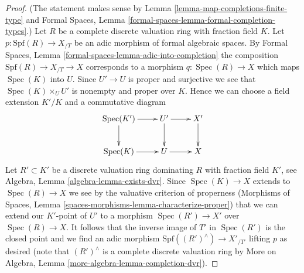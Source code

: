 \documentclass[10pt,a4paper]{amsart}
\theoremstyle{plain}
\theoremstyle{definition}
\theoremstyle{remark}
\numberwithin{equation}{subsection}
\def\Spec{\mathop{\mathrm{Spec}}}
\begin{document}
\begin{proof}
(The statement makes sense by
Lemma \ref{lemma-map-completions-finite-type} and
Formal Spaces, Lemma \ref{formal-spaces-lemma-formal-completion-types}.)
Let $R$ be a complete discrete valuation ring with fraction field $K$.
Let $p : \text{Spf}(R) \to X_{/T}$ be an adic morphism of
formal algebraic spaces. By Formal Spaces, Lemma
\ref{formal-spaces-lemma-adic-into-completion}
the composition $\text{Spf}(R) \to X_{/T} \to X$
corresponds to a morphism $q : \Spec(R) \to X$
which maps $\Spec(K)$ into $U$. Since $U' \to U$ is proper and surjective
we see that $\Spec(K) \times_U U'$ is nonempty and proper over $K$.
Hence we can choose a field extension $K'/K$ and a commutative
diagram
$$
\xymatrix{
\Spec(K') \ar[r] \ar[d] & U' \ar[r] \ar[d] & X' \ar[d] \\
\Spec(K) \ar[r] & U \ar[r] & X
}
$$
Let $R' \subset K'$ be a discrete valuation ring dominating $R$
with fraction field $K'$, see Algebra, Lemma \ref{algebra-lemma-exists-dvr}.
Since $\Spec(K) \to X$ extends to $\Spec(R) \to X$ we see by the valuative
criterion of properness
(Morphisms of Spaces, Lemma \ref{spaces-morphisms-lemma-characterize-proper})
that we can extend our $K'$-point of $U'$ to a morphism
$\Spec(R') \to X'$ over $\Spec(R) \to X$.
It follows that the inverse image of $T'$ in $\Spec(R')$ is the
closed point and we find an adic morphism
$\text{Spf}((R')^\wedge) \to X'_{/T'}$ lifting $p$
as desired (note that $(R')^\wedge$ is a complete discrete valuation ring
by More on Algebra, Lemma \ref{more-algebra-lemma-completion-dvr}).
\end{proof}
\end{document}

